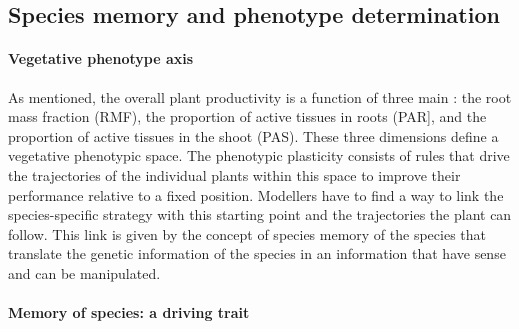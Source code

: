 
\subsection{Species memory and phenotype determination}\label{subsection:memory}


\paragraph{Vegetative phenotype axis}

As mentioned, the overall plant productivity is a function of three main : the root mass fraction (RMF), the proportion of active tissues in roots (PAR], and the proportion of active tissues in the shoot (PAS). These three dimensions define a vegetative phenotypic space. The phenotypic plasticity consists of rules that drive the trajectories of the individual plants within this space to improve their performance relative to a fixed position. Modellers have to find a way to link the species-specific strategy with this starting point and the trajectories the plant can follow. This link is given by the concept of species memory of the species that translate the genetic information of the species in an information that have sense and can be manipulated.


\paragraph{Memory of species: a driving trait}

